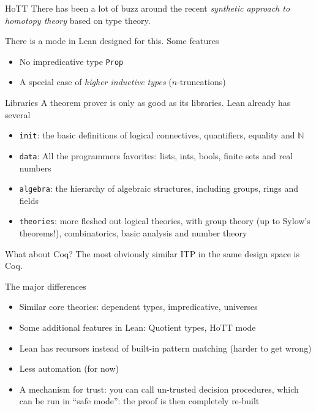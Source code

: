 \documentclass{beamer}
\newcommand{\ttt}[1]{\texttt{#1}}
\newcommand{\bN}{\mathbb{N}}
\newcommand{\Prop}{\ttt{Prop}}
\begin{document}
\begin{frame}[fragile]{HoTT}
  There has been a lot of buzz around the recent \emph{synthetic
    approach to homotopy theory} based on type theory.\bigskip

  There is a mode in Lean designed for this. Some features
  \begin{itemize}
  \item No impredicative type \Prop
  \item A special case of \emph{higher inductive types} ($n$-truncations)
  \end{itemize}
\end{frame}


\begin{frame}[fragile]{Libraries}
  A theorem prover is only as good as its libraries. Lean already has several
  \begin{itemize}
  \item \ttt{init}: the basic definitions of logical connectives,
    quantifiers, equality and $\bN$
  \item \ttt{data}: All the programmers favorites: lists, ints, bools,
    finite sets and real numbers
  \item \ttt{algebra}: the hierarchy of algebraic structures, including groups, rings and fields
  \item \ttt{theories}: more fleshed out logical theories, with group
    theory (up to Sylow's theorems!), combinatorics, basic analysis
    and number theory
  \end{itemize}
\end{frame}


\begin{frame}[fragile]{What about Coq?}
  The most obviously similar ITP in the same design space is Coq.
  \begin{block}{The major differences}
    \begin{itemize}
    \item Similar core theories: dependent types, impredicative, universes
    \item Some additional features in Lean: Quotient types, HoTT mode
    \item Lean has recursors instead of built-in pattern matching
      (harder to get wrong)
    \item Less automation (for now)
    \item A mechanism for trust: you can call un-trusted decision
      procedures, which can be run in ``safe mode'': the proof is then
      completely re-built
    \end{itemize}
  \end{block}
 
\end{frame}


\end{document}
